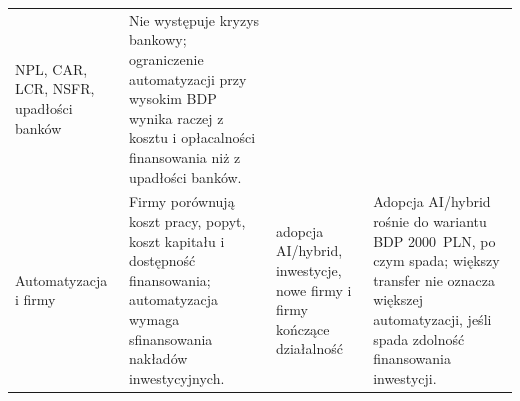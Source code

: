 \begin{table}[htbp]
\begin{tabularx}{\textwidth}{@{}>{\raggedright\arraybackslash}p{}>{\raggedright\arraybackslash}p{}>{\raggedright\arraybackslash}p{}>{\raggedright\arraybackslash}X@{}}
NPL, CAR, LCR, NSFR, upadłości banków &
Nie występuje kryzys bankowy; ograniczenie automatyzacji przy wysokim BDP wynika raczej z kosztu i opłacalności finansowania niż z upadłości banków. \\
\addlinespace
Automatyzacja i firmy &
Firmy porównują koszt pracy, popyt, koszt kapitału i dostępność finansowania; automatyzacja wymaga sfinansowania nakładów inwestycyjnych. &
adopcja AI/hybrid, inwestycje, nowe firmy i firmy kończące działalność &
Adopcja AI/hybrid rośnie do wariantu BDP 2000~PLN, po czym spada; większy transfer nie oznacza większej automatyzacji, jeśli spada zdolność finansowania inwestycji. \\
\bottomrule
\end{tabularx}
\end{table}
